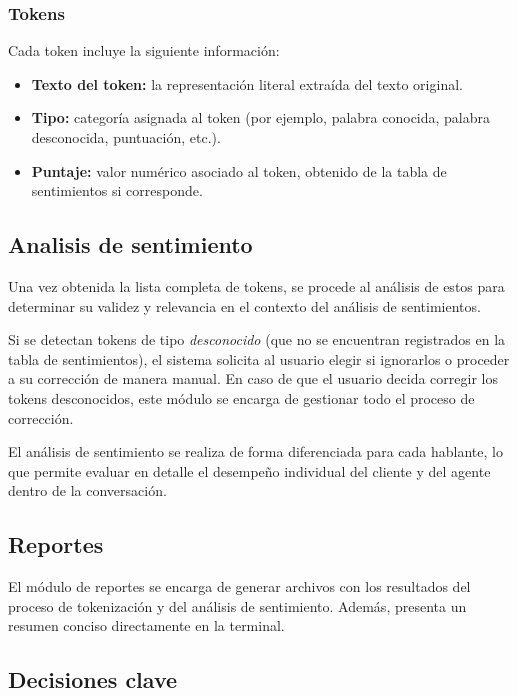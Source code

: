 \subsubsection{Tokens}
Cada token incluye la siguiente información:

\begin{itemize}
	\item \textbf{Texto del token:} la representación literal extraída del texto original.
	\item \textbf{Tipo:} categoría asignada al token (por ejemplo, palabra conocida, palabra desconocida, puntuación, etc.).
	\item \textbf{Puntaje:} valor numérico asociado al token, obtenido de la tabla de sentimientos si corresponde.
\end{itemize}

\subsection{Analisis de sentimiento}
Una vez obtenida la lista completa de tokens, se procede al análisis de estos para determinar
su validez y relevancia en el contexto del análisis de sentimientos.

Si se detectan tokens de tipo \emph{desconocido} (que no se encuentran registrados en la tabla
de sentimientos), el sistema solicita al usuario elegir si ignorarlos o proceder a su
corrección de manera manual. En caso de que el usuario decida corregir los tokens desconocidos,
este módulo se encarga de gestionar todo el proceso de corrección.

El análisis de sentimiento se realiza de forma diferenciada para cada hablante, lo que permite
evaluar en detalle el desempeño individual del cliente y del agente dentro de la conversación.

\subsection{Reportes}
El módulo de reportes se encarga de generar archivos con los resultados del proceso de
tokenización y del análisis de sentimiento. Además, presenta un resumen conciso directamente en
la terminal.

\subsection{Decisiones clave}

